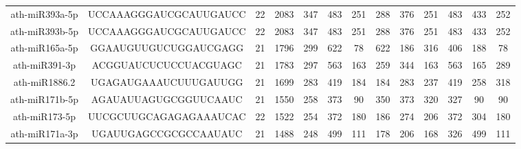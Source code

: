 \begin{landscape}
\begin{table}[]
\begin{tabular}{ccccccccccccc}
    ath-miR393a-5p   & UCCAAAGGGAUCGCAUUGAUCC   & 22           & 2083         & 347              & 483          & 251                          & 288                  & 376                  & 251                   & 483                   & 433                   & 252                   \\
    ath-miR393b-5p   & UCCAAAGGGAUCGCAUUGAUCC   & 22           & 2083         & 347              & 483          & 251                          & 288                  & 376                  & 251                   & 483                   & 433                   & 252                   \\
    ath-miR165a-5p   & GGAAUGUUGUCUGGAUCGAGG    & 21           & 1796         & 299              & 622          & 78                           & 622                  & 186                  & 316                   & 406                   & 188                   & 78                    \\
    ath-miR391-3p    & ACGGUAUCUCUCCUACGUAGC    & 21           & 1783         & 297              & 563          & 163                          & 259                  & 344                  & 163                   & 563                   & 165                   & 289                   \\
    ath-miR1886.2    & UGAGAUGAAAUCUUUGAUUGG    & 21           & 1699         & 283              & 419          & 184                          & 184                  & 283                  & 237                   & 419                   & 258                   & 318                   \\
    ath-miR171b-5p   & AGAUAUUAGUGCGGUUCAAUC    & 21           & 1550         & 258              & 373          & 90                           & 350                  & 373                  & 320                   & 327                   & 90                    & 90                    \\
    ath-miR173-5p    & UUCGCUUGCAGAGAGAAAUCAC   & 22           & 1522         & 254              & 372          & 180                          & 186                  & 274                  & 206                   & 372                   & 304                   & 180                   \\
    ath-miR171a-3p   & UGAUUGAGCCGCGCCAAUAUC    & 21           & 1488         & 248              & 499          & 111                          & 178                  & 206                  & 168                   & 326                   & 499                   & 111                   \\

\end{tabular}
\end{table}
\end{landscape}
